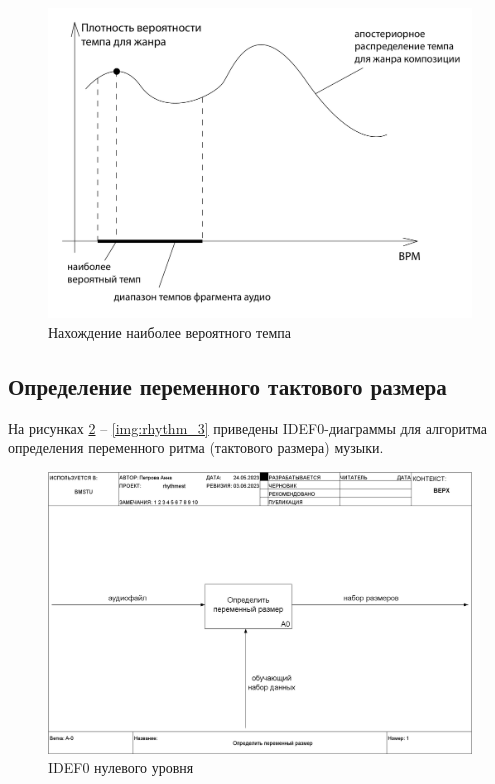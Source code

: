 \begin{figure}[h]
	\centering
	\includegraphics[scale=0.5]{svg/res_tempo.pdf}
	\caption{Нахождение наиболее вероятного темпа}
	\label{img:res_tempo}
\end{figure}

\clearpage

\subsection{Определение переменного тактового размера}

На рисунках \ref{img:rhythm_0} -- \ref{img:rhythm_3} приведены IDEF0-диаграммы для алгоритма определения переменного ритма (тактового размера) музыки.

\begin{figure}[h]
	\centering
	\includegraphics[scale=0.25]{inc/img/rhythm_idef/01_A-0.png}
	\caption{IDEF0 нулевого уровня}
	\label{img:rhythm_0}
\end{figure}

